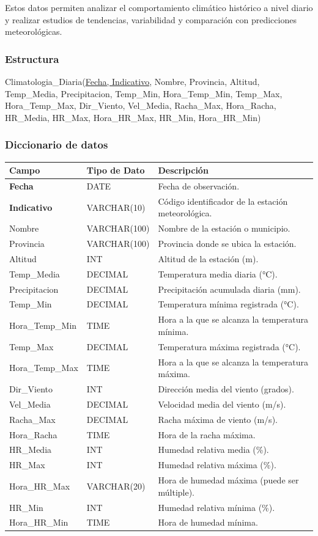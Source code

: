 \documentclass[12pt, a4paper]{article}
\begin{document}
Estos datos permiten analizar el comportamiento climático histórico a nivel diario y realizar estudios de tendencias, variabilidad y comparación con predicciones meteorológicas.

\subsubsection*{Estructura}
Climatologia\_Diaria(\underline{Fecha, Indicativo}, Nombre, Provincia, Altitud, Temp\_Media, Precipitacion, Temp\_Min, Hora\_Temp\_Min, Temp\_Max, Hora\_Temp\_Max, Dir\_Viento, Vel\_Media, Racha\_Max, Hora\_Racha, HR\_Media, HR\_Max, Hora\_HR\_Max, HR\_Min, Hora\_HR\_Min)

\subsubsection*{Diccionario de datos}
\begin{center}
\begin{tabular}{|p{}|p{}|p{}|}
\hline
\textbf{Campo} & \textbf{Tipo de Dato} & \textbf{Descripción} \\
\hline
\textbf{Fecha} & DATE & Fecha de observación. \\
\textbf{Indicativo} & VARCHAR(10) & Código identificador de la estación meteorológica. \\
Nombre & VARCHAR(100) & Nombre de la estación o municipio. \\
Provincia & VARCHAR(100) & Provincia donde se ubica la estación. \\
Altitud & INT & Altitud de la estación (m). \\
Temp\_Media & DECIMAL & Temperatura media diaria (°C). \\
Precipitacion & DECIMAL & Precipitación acumulada diaria (mm). \\
Temp\_Min & DECIMAL & Temperatura mínima registrada (°C). \\
Hora\_Temp\_Min & TIME & Hora a la que se alcanza la temperatura mínima. \\
Temp\_Max & DECIMAL & Temperatura máxima registrada (°C). \\
Hora\_Temp\_Max & TIME & Hora a la que se alcanza la temperatura máxima. \\
Dir\_Viento & INT & Dirección media del viento (grados). \\
Vel\_Media & DECIMAL & Velocidad media del viento (m/s). \\
Racha\_Max & DECIMAL & Racha máxima de viento (m/s). \\
Hora\_Racha & TIME & Hora de la racha máxima. \\
HR\_Media & INT & Humedad relativa media (\%). \\
HR\_Max & INT & Humedad relativa máxima (\%). \\
Hora\_HR\_Max & VARCHAR(20) & Hora de humedad máxima (puede ser múltiple). \\
HR\_Min & INT & Humedad relativa mínima (\%). \\
Hora\_HR\_Min & TIME & Hora de humedad mínima. \\
\hline
\end{tabular}
\end{center}
\end{document}
